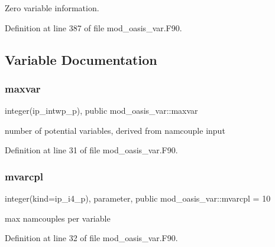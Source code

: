 Zero variable information. 



Definition at line 387 of file mod\+\_\+oasis\+\_\+var.\+F90.



\subsection{Variable Documentation}
\mbox{\label{namespacemod__oasis__var_a151c4be67882fc8d02f66e4a1822b692}} 
\subsubsection{\texorpdfstring{maxvar}{maxvar}}
{\footnotesize\ttfamily integer(ip\+\_\+intwp\+\_\+p), public mod\+\_\+oasis\+\_\+var\+::maxvar}



number of potential variables, derived from namcouple input 



Definition at line 31 of file mod\+\_\+oasis\+\_\+var.\+F90.

\mbox{\label{namespacemod__oasis__var_a687d6dce16699f36ae3a67accfdba3a9}} 
\subsubsection{\texorpdfstring{mvarcpl}{mvarcpl}}
{\footnotesize\ttfamily integer(kind=ip\+\_\+i4\+\_\+p), parameter, public mod\+\_\+oasis\+\_\+var\+::mvarcpl = 10}



max namcouples per variable 



Definition at line 32 of file mod\+\_\+oasis\+\_\+var.\+F90.

\mbox{\label{namespacemod__oasis__var_a095f8ad84e6afbcbe1744d4a9f924e08}} 
